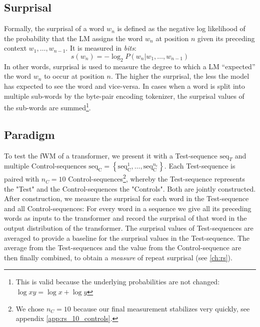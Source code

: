 \subsection{Surprisal}
Formally, the surprisal of a word $w_n$ is defined as the negative log likelihood of the probability that the LM assigns the word $w_n$ at position $n$ given its preceding context $w_1, \dots, w_{n-1}$. It is measured in \textit{bits}:
\begin{equation}
    s(w_n) = - \log_2{P(w_n | w_1, \dots, w_{n-1})}
\end{equation}
In other words, surprisal is used to measure the degree to which a LM ``expected'' the word $w_n$ to occur at position $n$. The higher the surprisal, the less the model has expected to see the word and vice-versa.
In cases when a word is split into multiple sub-words by the byte-pair encoding tokenizer, the surprisal values of the sub-words are summed\footnote{This is valid because the underlying probabilities are not changed: $\log{xy} = \log{x} + \log{y}$}.


\subsection{Paradigm} \label{methods:paradigm}

To test the fWM of a transformer, we present it with a Test-sequence $\text{seq}_T$ and multiple Control-sequences $\text{seq}_{\text{C}} = \left\{ \text{seq}_{\text{C}}^1, \dots, \text{seq}_{\text{C}}^{n_{\text{c}}} \right\}$.
Each Test-sequence is paired with $n_C = 10$ Control-sequences\footnote{We chose $n_C = 10$ because our final measurement stabilizes very quickly, see appendix \ref{app:rs_10_controls}.}, whereby the Test-sequence represents the "Test" and the Control-sequences the "Controls".
Both are jointly constructed.
After construction, we measure the surprisal for each word in the Test-sequence and all Control-sequences:
For every word in a sequence we give all its preceding words as inputs to the transformer and record the surprisal of that word in the output distribution of the transformer.
The surprisal values of Test-sequences are averaged to provide a baseline for the surprisal values in the Test-sequence.
The average from the Test-sequences and the value from the Control-sequence are then finally combined, to obtain a \textit{measure} of repeat surprisal (see \ref{ch:rs}).

